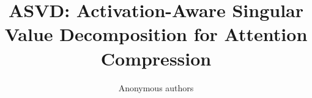 \title{\textbf{ASVD: Activation-Aware Singular Value Decomposition for Attention Compression}}

\author{Anonymous authors}
